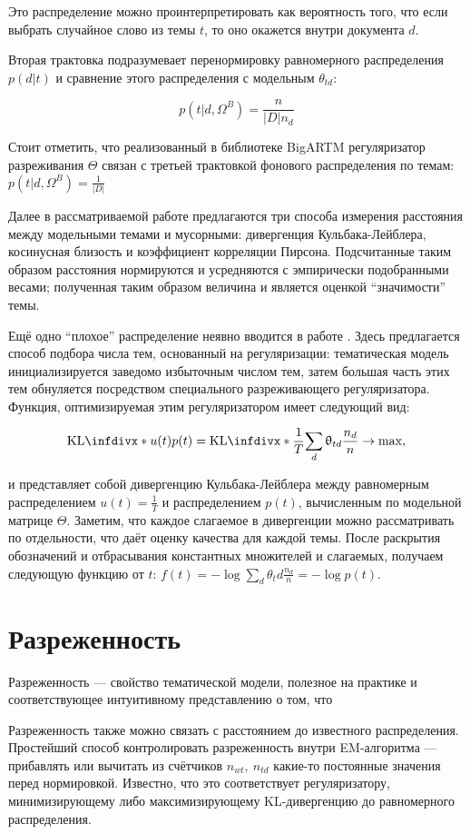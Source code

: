 Это распределение можно проинтерпретировать как вероятность того, что если выбрать случайное слово из темы $t$, то оно окажется внутри документа $d$.

Вторая трактовка подразумевает перенормировку равномерного распределения $p(d|t)$ и сравнение этого распределения с модельным $\theta_{td}$:

$$p(t|d, \Omega^B) = \frac{n}{|D| n_d} $$

Стоит отметить, что реализованный в библиотеке BigARTM регуляризатор разреживания $\Theta$ связан с третьей трактовкой фонового распределения по темам: $p(t|d, \Omega^B) = \frac{1}{|D|} $

Далее в рассматриваемой работе предлагаются три способа измерения расстояния между модельными темами и мусорными: дивергенция Кульбака-Лейблера, косинусная близость и коэффициент корреляции Пирсона. Подсчитанные таким образом расстояния нормируются и усредняются с эмпирически подобранными весами; полученная таким образом величина и является оценкой ``значимости'' темы.

Ещё одно ``плохое'' распределение неявно вводится в работе \cite{plavin}. Здесь предлагается способ подбора числа тем, основанный на регуляризации: тематическая модель инициализируется заведомо избыточным числом тем, затем большая часть этих тем обнуляется посредством специального разреживающего регуляризатора. Функция, оптимизируемая этим регуляризатором имеет следующий вид:

\[
\textup{KL}\infdiv*{u(t)}{p(t)}=\textup{KL}\infdiv*{\frac{1}{T}}{\sum_d \theta_{td} \frac{n_d}{n}} \rightarrow \max,
\]

и представляет собой дивергенцию Кульбака-Лейблера между равномерным распределением $u(t) = \frac{1}{T}$ и распределением $p(t)$, вычисленным по модельной матрице $\Theta$. Заметим, что каждое слагаемое в дивергенции можно рассматривать по отдельности, что даёт оценку качества для каждой темы. После раскрытия обозначений и отбрасывания константных множителей и слагаемых, получаем следующую функцию от $t$: $f(t) = - \log \sum_d \theta_td \frac{n_d}{n} = -\log p(t)$.

\section{Разреженность}

Разреженность --- свойство тематической модели, полезное на практике и соответствующее интуитивному представлению о том, что 


Разреженность также можно связать с расстоянием до известного распределения. Простейший способ контролировать разреженность внутри EM-алгоритма  --- прибавлять или вычитать из счётчиков $n_{wt},~n_{td}$ какие-то постоянные значения перед нормировкой. Известно, что это соответствует регуляризатору, минимизирующему либо максимизирующему KL-дивергенцию до равномерного распределения.

